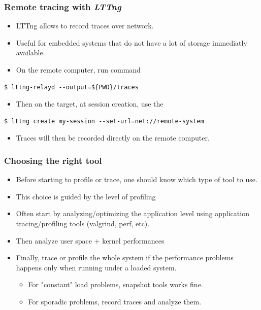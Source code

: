 \begin{frame}[fragile]
  \frametitle{Remote tracing with {\em LTTng}}
  \begin{itemize}
    \item LTTng allows to record traces over network.
    \item Useful for embedded systems that do not have a lot of storage
          immediatly available.
    \item On the remote computer, run  command
  \end{itemize}
  \begin{block}{}
    \begin{verbatim}
$ lttng-relayd --output=${PWD}/traces
   \end{verbatim}
  \end{block}
  \begin{itemize}
    \item Then on the target, at session creation, use the 
  \end{itemize}
  \begin{block}{}
    \begin{verbatim}
$ lttng create my-session --set-url=net://remote-system
   \end{verbatim}
  \end{block}
  \begin{itemize}
    \item Traces will then be recorded directly on the remote computer.
  \end{itemize}
\end{frame}

\begin{frame}[fragile]
  \frametitle{Choosing the right tool}
  \begin{itemize}
    \item Before starting to profile or trace, one should know which type of
          tool to use.
    \item This choice is guided by the level of profiling
    \item Often start by analyzing/optimizing the application level using
          application tracing/profiling tools (valgrind, perf, etc).
    \item Then analyze user space + kernel performances
    \item Finally, trace or profile the whole system if the performance problems
          happens only when running under a loaded system.
    \begin{itemize}
      \item For "constant" load problems, snapshot tools works fine.
      \item For sporadic problems, record traces and analyze them.
    \end{itemize}
  \end{itemize}
\end{frame}
